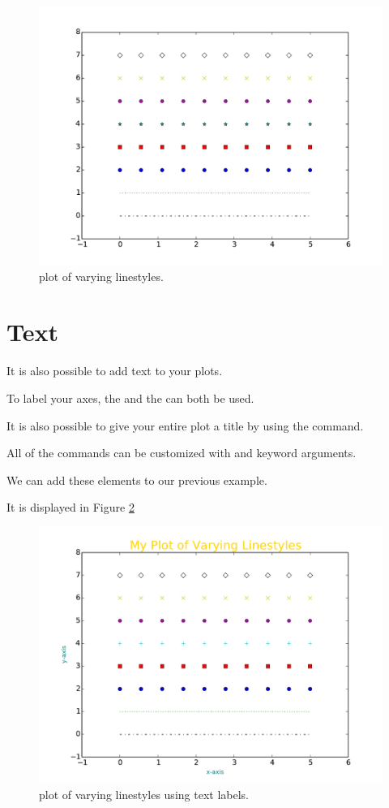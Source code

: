 \begin{figure} 
\includegraphics[width=\textwidth]{linestyle.pdf}
\caption{plot of varying linestyles.}
\label{linestyle} 
\end{figure}


\section*{Text}
It is also possible to add text to your plots. 

To label your axes, the  and the  can both be used. 

It is also possible to give your entire plot a title by using the  command. 

All of the  commands can be customized with  and  keyword arguments. 

We can add these elements to our previous example. 

It is displayed in Figure \ref{text}


\begin{figure} 
\includegraphics[width=\textwidth]{text.pdf}
\caption{plot of varying linestyles using text labels.}
\label{text} 
\end{figure}

